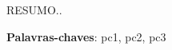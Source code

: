 \begin{resumo}
 RESUMO..

 \vspace{\onelineskip}
    
 \noindent
 \textbf{Palavras-chaves}: pc1, pc2, pc3
\end{resumo}

